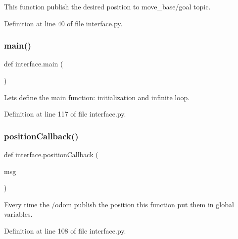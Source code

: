 This function publish the desired position to \textquotesingle{}move\+\_\+base/goal\textquotesingle{} topic. 



Definition at line 40 of file interface.\+py.

\mbox{\label{namespaceinterface_ac84656acec70183a4ef276f4a3343971}} 
\subsubsection{\texorpdfstring{main()}{main()}}
{\footnotesize\ttfamily def interface.\+main (\begin{DoxyParamCaption}{ }\end{DoxyParamCaption})}



Let\textquotesingle{}s define the main function\+: initialization and infinite loop. 



Definition at line 117 of file interface.\+py.

\mbox{\label{namespaceinterface_a1b788c3588460b432a0ecf905def2092}} 
\subsubsection{\texorpdfstring{position\+Callback()}{positionCallback()}}
{\footnotesize\ttfamily def interface.\+position\+Callback (\begin{DoxyParamCaption}\item[{}]{msg }\end{DoxyParamCaption})}



Every time the \textquotesingle{}/odom\textquotesingle{} publish the position this function put them in global variables. 



Definition at line 108 of file interface.\+py.

\mbox{\label{namespaceinterface_a77f849df9c7df3c30a5f806d8ed5803f}} 
